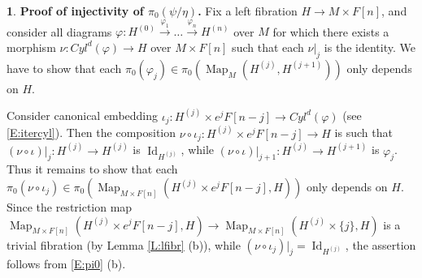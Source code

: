 \documentclass[12pt]{amsart}
\theoremstyle{plain}
\theoremstyle{definition}
\newtheorem{Emp}[Thm]{}
\numberwithin{equation}{section}
\newcommand{\lra}{\longrightarrow}
\newcommand{\rl}[1]{Lemma \ref{L:#1}}
\newcommand{\re}[1]{\ref{E:#1}}
\newcommand{\Map}{\operatorname{Map}}
\newcommand{\Id}{\operatorname{Id}}
\begin{document}
\begin{Emp} \label{E:step6}
{\bf Proof of injectivity of $\pi_0(\psi/\eta)$.} Fix a left
fibration $H\to M\times F[n]$, and consider all diagrams
$\varphi:H^{(0)}\overset{\varphi_1}{\lra}\ldots
\overset{\varphi_n}{\lra} H^{(n)}$ over $M$ for which there exists
a morphism $\nu:Cyl^d(\varphi)\to H$ over $M\times F[n]$ such that
each $\nu|_j$ is the identity. We have to show that each 
$\pi_0(\varphi_j)\in\pi_0(\Map_{M}(H^{(j)},H^{(j+1)}))$
only depends on $H$.

Consider canonical embedding $\iota_j:H^{(j)}\times e^j F[n-j]\to
Cyl^d(\varphi)$ (see \re{itercyl}). Then the composition
$\nu\circ\iota_j:H^{(j)}\times e^j F[n-j]\to H$ is such that 
$(\nu\circ\iota)|_j:H^{(j)}\to H^{(j)}$ is $\Id_{H^{(j)}}$, while
$(\nu\circ\iota)|_{j+1}:H^{(j)}\to H^{(j+1)}$ is $\varphi_j$. Thus
it remains to show that each 
$\pi_0(\nu\circ\iota_j)\in\pi_0(\Map_{M\times F[n]}(H^{(j)}\times e^j F[n-j],
H))$ only depends on $H$. Since the restriction map $\Map_{M\times
F[n]}(H^{(j)}\times e^j F[n-j], H)\to\Map_{M\times
F[n]}(H^{(j)}\times\{j\}, H)$ is a trivial fibration (by \rl{lfibr} (b)), while
$(\nu\circ\iota_j)|_j=\Id_{H^{(j)}}$, the assertion follows from
\re{pi0} (b).
\end{Emp}
\end{document}
